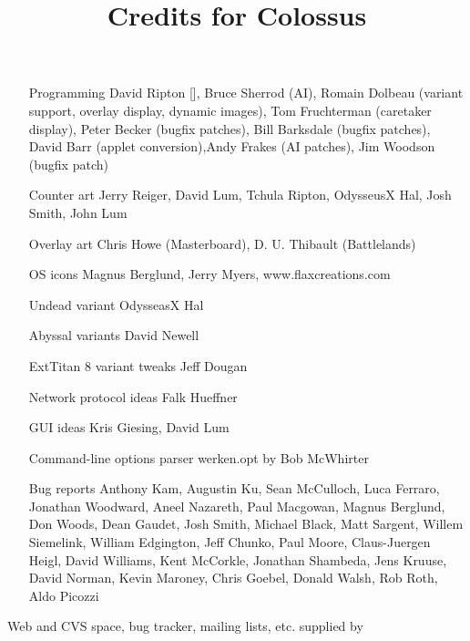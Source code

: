 \documentclass{article}
\begin{document}

\title{Credits for Colossus}

\maketitle

\begin{itemize}

\item[Programming] David Ripton [], Bruce Sherrod (AI), Romain Dolbeau (variant support, overlay display, dynamic images), Tom Fruchterman (caretaker display), Peter Becker (bugfix patches), Bill Barksdale (bugfix patches), David Barr (applet conversion),Andy Frakes (AI patches), Jim Woodson (bugfix patch)

\item[Counter art] Jerry Reiger, David Lum, Tchula Ripton, OdysseusX Hal, Josh Smith, John Lum

\item[Overlay art] Chris Howe (Masterboard), D. U. Thibault (Battlelands)

\item[OS icons] Magnus Berglund, Jerry Myers, www.flaxcreations.com

\item[Undead variant] OdysseasX Hal

\item[Abyssal variants] David Newell

\item[ExtTitan 8 variant tweaks] Jeff Dougan

\item[Network protocol ideas] Falk Hueffner

\item[GUI ideas] Kris Giesing, David Lum

\item[Command-line options parser] werken.opt by Bob McWhirter

\item[Bug reports] Anthony Kam, Augustin Ku, Sean McCulloch, Luca Ferraro, Jonathan Woodward, Aneel Nazareth, Paul Macgowan, Magnus Berglund, Don Woods, Dean Gaudet, Josh Smith, Michael Black, Matt Sargent, Willem Siemelink, William Edgington, Jeff Chunko, Paul Moore, Claus-Juergen Heigl, David Williams, Kent McCorkle, Jonathan Shambeda, Jens Kruuse, David Norman, Kevin Maroney, Chris Goebel, Donald Walsh, Rob Roth, Aldo Picozzi


\end{itemize}

Web and CVS space, bug tracker, mailing lists, etc. supplied by 
\end{document}
